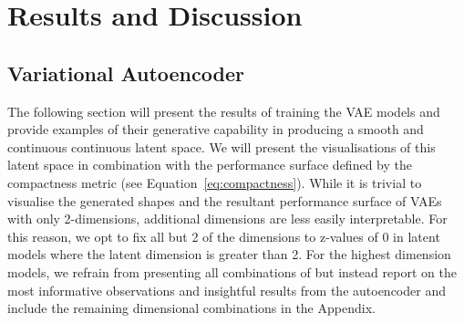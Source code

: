 \documentclass{article}
\begin{document}
\begin{table}[h]
\centering
{}
\caption{Genetic Algorithm Tested Optimisation Tasks for Latent Representations Shapes}
\label{tab:GA_models_latent}
\end{table}


\newpage{}

\section{Results and Discussion}\label{Results_section}
\subsection{Variational Autoencoder}\label{results_VAE}
The following section will present the results of training the VAE models and provide examples of their generative capability in producing a smooth and continuous continuous latent space. We will present the visualisations of this latent space in combination with the performance surface defined by the compactness metric (see Equation~\eqref{eq:compactness}). While it is trivial to visualise the generated shapes and the resultant performance surface of VAEs with only 2-dimensions, additional dimensions are less easily interpretable. For this reason, we opt to fix all but 2 of the dimensions to z-values of 0 in latent models where the latent dimension is greater than 2. For the highest dimension models, we refrain from presenting all combinations of but instead report on the most informative observations and insightful results from the autoencoder and include the remaining dimensional combinations in the Appendix.
\end{document}
